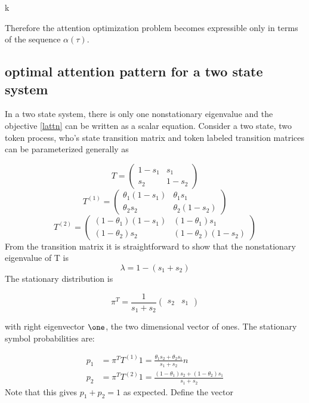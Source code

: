 k\documentclass{article}
\begin{document}
Therefore the attention optimization problem becomes expressible only in terms of the sequence $\alpha(\tau)$. 

\subsection{optimal attention pattern for a two state system}
In a two state system, there is only one nonstationary eigenvalue and the objective \eqref{lattn} can be written as a scalar equation. Consider a two state, two token process, who's state transition matrix and token labeled transition matrices can be parameterized generally as

\begin{equation}\label{Tts}
T = \begin{pmatrix}
1-s_1 & s_1\\
s_2 & 1-s_2
\end{pmatrix}
\end{equation}
\begin{equation}\label{T1ts}
T^{(1)} = \begin{pmatrix}
\theta_1(1-s_1) & \theta_1s_1 \\
\theta_2 s_2 & \theta_2(1-s_2)
\end{pmatrix}
\end{equation}
\begin{equation}\label{T2ts}
T^{(2)} = \begin{pmatrix}
(1-\theta_1)(1-s_1) & (1-\theta_1)s_1 \\
(1-\theta_2) s_2 & (1-\theta_2)(1-s_2)
\end{pmatrix}
\end{equation}
From the transition matrix it is straightforward to show that the nonstationary eigenvalue of T is 
\begin{equation}\label{lamts}
\lambda =1- (s_1+s_2)
\end{equation}
The stationary distribution is

\begin{equation}
\pi^T = \frac{1}{s_1 + s_2}\begin{pmatrix}
s_2 & s_1
\end{pmatrix}
\end{equation}

with right eigenvector $\one$, the two dimensional vector of ones. The stationary symbol probabilities are:

\begin{align}
	p_1 &= \pi^T T^{(1)}1 = \frac{\theta_1s_2 + \theta_2s_1}{s_1+s_2}n \label{p1}\\
	p_2 &= \pi^T T^{(2)}1 = \frac{(1-\theta_1)s_2 + (1-\theta_2)s_1}{s_1+s_2}\label{p2}
\end{align}
Note that this gives $p_1 + p_2 = 1$ as expected. Define the vector 
\end{document}
